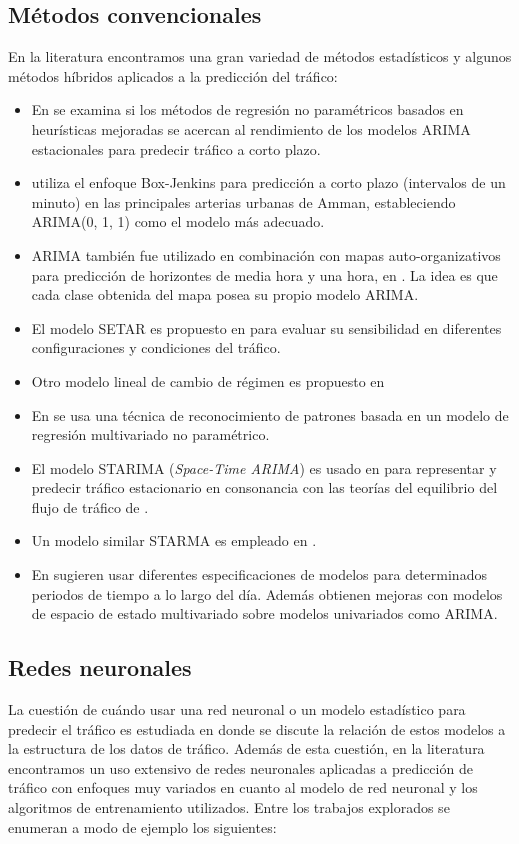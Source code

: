 \documentclass{llncs}
\begin{document}
\subsection{Métodos convencionales}
En la literatura encontramos una gran variedad de métodos estadísticos y algunos métodos híbridos aplicados a la predicción del tráfico:
\begin{itemize}
\item En \cite{smith2002comparison} se examina si los métodos de regresión no paramétricos basados en heurísticas mejoradas se acercan al rendimiento de los modelos ARIMA estacionales para predecir tráfico a corto plazo.
\item \cite{hamed1995short} utiliza el enfoque Box-Jenkins para predicción a corto plazo (intervalos de un minuto) en las principales arterias urbanas de Amman, estableciendo ARIMA(0, 1, 1) como el modelo más adecuado.
\item ARIMA también fue utilizado en combinación con mapas auto-organizativos para predicción de horizontes de media hora y una hora, en \cite{van1996combining}. La idea es que cada clase obtenida del mapa posea su propio modelo ARIMA. 
\item El modelo SETAR es propuesto en \cite{ishak2002performance} para evaluar su sensibilidad en diferentes configuraciones y condiciones del tráfico.
\item Otro modelo lineal de cambio de régimen es propuesto en \cite{zhang2003short} 
\item En \cite{clark2003traffic} se usa una técnica de reconocimiento de patrones basada en un modelo de regresión multivariado no paramétrico.
\item El modelo STARIMA (\emph{Space-Time ARIMA}) es usado en \cite{kamarianakis2005space} para representar y predecir tráfico estacionario en consonancia con las teorías del equilibrio del flujo de tráfico de \cite{wardrop1952correspondence}. 
\item Un modelo similar STARMA es empleado en \cite{min2011real}.
\item En \cite{stathopoulos2003multivariate} sugieren usar diferentes especificaciones de modelos para determinados periodos de tiempo a lo largo del día. Además obtienen mejoras con modelos de espacio de estado multivariado sobre modelos univariados como ARIMA.
\end{itemize}

\subsection{Redes neuronales}
La cuestión de cuándo usar una red neuronal o un modelo estadístico para predecir el tráfico es estudiada en \cite{kirby1997should} donde se discute la relación de estos modelos a la estructura de los datos de tráfico. Además de esta cuestión, en la literatura encontramos un uso extensivo de redes neuronales aplicadas a predicción de tráfico con enfoques muy variados en cuanto al modelo de red neuronal y los algoritmos de entrenamiento utilizados. Entre los trabajos explorados se enumeran a modo de ejemplo los siguientes:
\end{document}
